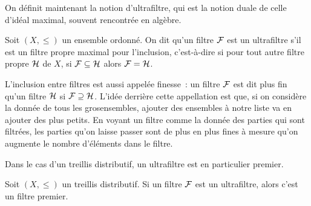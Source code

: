 On définit maintenant la notion d'ultrafiltre, qui est la notion duale de celle
d'idéal maximal, souvent rencontrée en algèbre.

\begin{definition}[Ultrafiltre]
  Soit $(X,\leq)$ un ensemble ordonné. On dit qu'un filtre $\mathcal{F}$ est un
  ultrafiltre s'il est un filtre propre maximal pour l'inclusion, c'est-à-dire
  si pour tout autre filtre propre $\mathcal{H}$ de $X$, si
  $\mathcal{F} \subseteq\mathcal{H}$ alors $\mathcal{F} = \mathcal{H}$.
\end{definition}

\begin{remark}
  L'inclusion entre filtres est aussi appelée \og finesse\fg~: un filtre
  $\mathcal{F}$ est dit plus fin qu'un filtre $\mathcal{H}$ si
  $\mathcal{F}\supseteq\mathcal{H}$. L'idée derrière cette appellation est que, si on
  considère la donnée de tous les \og gros\fg ensembles, ajouter des ensembles
  à notre liste va en ajouter des plus petits. En voyant un filtre comme la
  donnée des parties qui sont filtrées, les parties qu'on laisse passer sont de
  plus en plus fines à mesure qu'on augmente le nombre d'éléments dans le
  filtre.
\end{remark}

\noindent
Dans le cas d'un treillis distributif, un ultrafiltre est en particulier
premier.

\begin{proposition}
  Soit $(X,\leq)$ un treillis distributif. Si un filtre $\mathcal{F}$ est un
  ultrafiltre, alors c'est un filtre premier.
\end{proposition}

